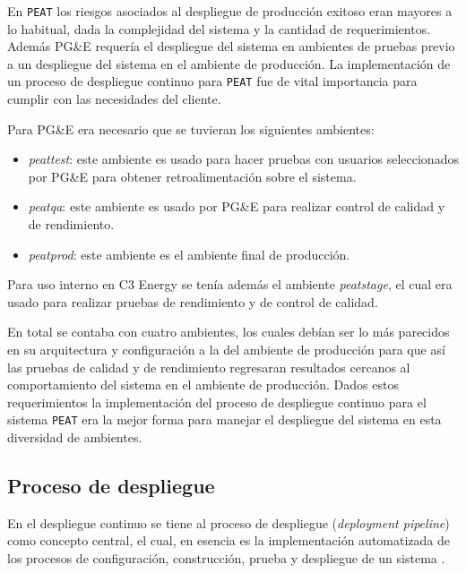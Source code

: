 En \texttt{PEAT} los riesgos asociados al despliegue de producción exitoso
eran mayores a lo habitual, dada la complejidad del sistema y la cantidad
de requerimientos. Además PG\&E requería el despliegue del sistema en ambientes
de pruebas previo a un despliegue del sistema en el ambiente de producción.
La implementación de un proceso de despliegue continuo para \texttt{PEAT} fue de
vital importancia para cumplir con las necesidades del cliente.

\vspace{2.5mm}

Para PG\&E era necesario que se tuvieran los siguientes ambientes:
\begin{itemize}
\item \textit{peattest}: este ambiente es usado para hacer pruebas con usuarios
  seleccionados por PG\&E para obtener retroalimentación sobre el sistema.
\item \textit{peatqa}: este ambiente es usado por PG\&E para realizar control de
  calidad y de rendimiento.
\item \textit{peatprod}: este ambiente es el ambiente final de producción.
\end{itemize}

Para uso interno en C3 Energy se tenía además el ambiente \textit{peatstage},
el cual era usado para realizar pruebas de rendimiento y de control de calidad.

En total se contaba con cuatro ambientes, los cuales debían ser lo más parecidos
en su arquitectura y configuración a la del ambiente de producción para que así las
pruebas de calidad y de rendimiento regresaran resultados cercanos al comportamiento
del sistema en el ambiente de producción.
Dados estos requerimientos la implementación del proceso de despliegue continuo para
el sistema \texttt{PEAT} era la mejor forma para manejar el despliegue del sistema
en esta diversidad de ambientes.

\subsection{Proceso de despliegue}

En el despliegue continuo se tiene al proceso de despliegue (\textit{deployment
  pipeline}) como concepto central, el cual, en esencia es la implementación
automatizada de los procesos de configuración, construcción, prueba y despliegue de
un sistema \cite{28_humble_farley_2011}.

\vspace{2.5mm}

